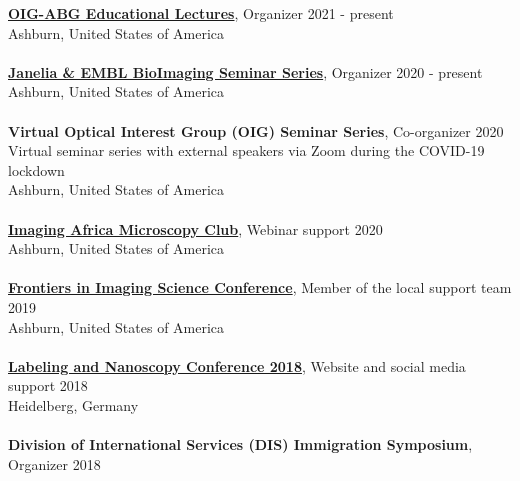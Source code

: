 \documentclass[margin,line]{res}
\begin{document}
\begin{resume}
{\bf \href{https://www.janelia.org/content/optical-interest-group}{OIG-ABG Educational Lectures}}, Organizer \hfill {2021 - present}\\
Ashburn, United States of America\\
\vspace*{-3mm}\\
{\bf \href{https://www.janelia.org/node/65736}{Janelia \& EMBL BioImaging Seminar Series}}, Organizer \hfill {2020 - present}\\
Ashburn, United States of America\\
\vspace*{-3mm}\\
{\bf Virtual Optical Interest Group (OIG) Seminar Series}, Co-organizer \hfill {2020}\\
Virtual seminar series with external speakers via Zoom during the COVID-19 lockdown\\
Ashburn, United States of America\\
\vspace*{-3mm}\\
{\bf \href{https://www.imagingafrica.org/}{Imaging Africa Microscopy Club}}, Webinar support \hfill {2020}\\
Ashburn, United States of America\\
\vspace*{-3mm}\\
{\bf \href{https://www.janelia.org/you-janelia/conferences/frontiers-in-imaging-science-ii}{ Frontiers in Imaging Science Conference}}, Member of the local support team \hfill {2019}\\
Ashburn, United States of America\\
\vspace*{-3mm}\\
{\bf \href{https://labeling-and-nanoscopy.de/}{Labeling and Nanoscopy Conference 2018}}, Website and social media support \hfill {2018}\\
Heidelberg, Germany\\
\vspace*{-3mm}\\
{\bf Division of International Services (DIS) Immigration Symposium}, Organizer  \hfill {2018}\\

\end{resume}
\end{document}
